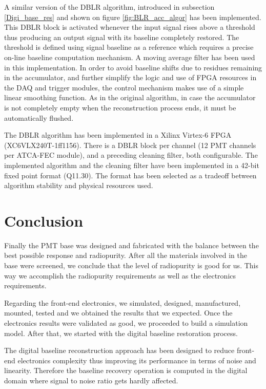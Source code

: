 \documentclass[a4paper, 10pt, oneside, twocolumn, 3p]{elsarticle}
\begin{document}
\par A similar version of the DBLR algorithm, introduced in subsection \ref{Digi_base_res} and shown on figure \ref{fig:BLR_acc_algor} has been implemented. This DBLR block is activated whenever the input signal rises above a threshold thus producing an output signal with its baseline completely restored. The threshold  is defined using signal baseline as a reference which requires a precise on-line baseline computation mechanism. A moving average filter has been used in this implementation. In order to avoid baseline shifts due to residues remaining in the accumulator, and further simplify the logic and use of FPGA resources in the DAQ and trigger modules, the control mechanism makes use of a simple linear smoothing function. As in the original algorithm, in case the accumulator is not completely empty when the reconstruction process ends, it must be automatically flushed.

\par The DBLR algorithm has been implemented in a Xilinx Virtex-6 FPGA (XC6VLX240T-1ff1156). There is a DBLR block per channel (12 PMT channels per ATCA-FEC module), and a preceding cleaning filter, both configurable. The implemented algorithm and the cleaning filter have been implemented in a 42-bit fixed point format (Q11.30). The format has been selected as a tradeoff between algorithm stability and physical resources used.


\section{Conclusion}

\par Finally the PMT base was designed and fabricated with the balance between the best possible response and radiopurity. After all the materials involved in the base were screened, we conclude that the level of radiopurity is good for us.  This way we accomplish the radiopurity requirements as well as the electronics requirements.

\par Regarding the front-end electronics, we simulated, designed, manufactured, mounted, tested and we obtained the results that we expected. Once the electronics results were validated as good, we proceeded to build a simulation model. After that, we started with the digital baseline restoration process.

\par The digital baseline reconstruction approach has been designed to reduce front-end electronics complexity thus improving its performance in terms of noise and linearity. Therefore the baseline recovery operation is computed in the digital domain where signal to noise ratio gets hardly affected.
\end{document}
